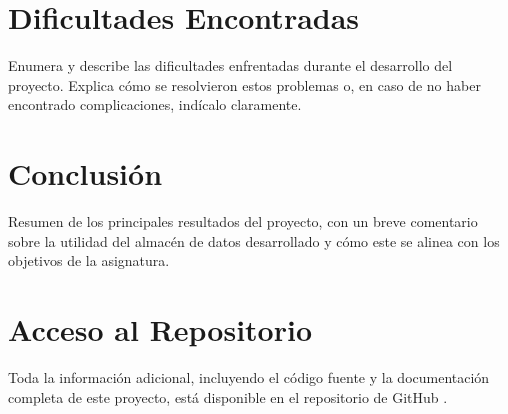 \documentclass{article}
\begin{document}
\section{Dificultades Encontradas}
\label{sec:dificultades_encontradas}
Enumera y describe las dificultades enfrentadas durante el desarrollo del proyecto. Explica cómo se resolvieron estos problemas o, en caso de no haber encontrado complicaciones, indícalo claramente.

\section{Conclusión}
\label{sec:conclusion}
Resumen de los principales resultados del proyecto, con un breve comentario sobre la utilidad del almacén de datos desarrollado y cómo este se alinea con los objetivos de la asignatura.


\newpage
\section{Acceso al Repositorio}

Toda la información adicional, incluyendo el código fuente y la documentación completa de este proyecto, está disponible en el repositorio de GitHub \cite{silva2024github}.

\end{document}
